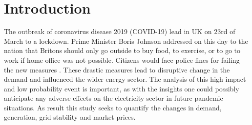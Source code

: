 \documentclass[energies,article,submit,moreauthors,pdftex]{Definitions/mdpi}
\begin{document}
\section{Introduction}
The outbreak of coronavirus disease 2019 (COVID-19) lead in UK on 23rd of March to a lockdown. Prime Minister Boris Johnson addressed on this day to the nation that Britons should only go outside to buy food, to exercise, or to go to work if home office was not possible. Citizens would face police fines for failing the new measures \cite{BritishForeignPolicyGroup2020COVID-19Timeline}. 
These drastic measures lead to disruptive change in the demand and influenced the wider energy sector. The analysis of this high impact and low probability event is important, as with the insights one could possibly anticipate any adverse effects on the electricity sector in future pandemic situations. 
As result this study seeks to quantify the changes in demand, generation, grid stability and market prices.




\end{document}
